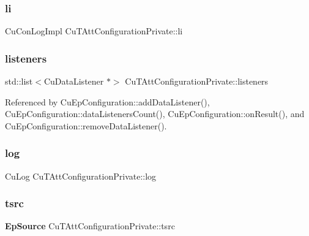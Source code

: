 \mbox{\label{classCuTAttConfigurationPrivate_a93eff7a8218b6d4941d4328b3c048d24}} 
\subsubsection{li}
{\footnotesize\ttfamily Cu\+Con\+Log\+Impl Cu\+T\+Att\+Configuration\+Private\+::li}

\mbox{\label{classCuTAttConfigurationPrivate_ae419412b1e5d82fbf18d79ad622f2d20}} 
\subsubsection{listeners}
{\footnotesize\ttfamily std\+::list$<$Cu\+Data\+Listener $\ast$$>$ Cu\+T\+Att\+Configuration\+Private\+::listeners}



Referenced by Cu\+Ep\+Configuration\+::add\+Data\+Listener(), Cu\+Ep\+Configuration\+::data\+Listeners\+Count(), Cu\+Ep\+Configuration\+::on\+Result(), and Cu\+Ep\+Configuration\+::remove\+Data\+Listener().

\mbox{\label{classCuTAttConfigurationPrivate_a9ba469d4830a26fd4e9c1320abd3fc7e}} 
\subsubsection{log}
{\footnotesize\ttfamily Cu\+Log Cu\+T\+Att\+Configuration\+Private\+::log}

\mbox{\label{classCuTAttConfigurationPrivate_aac90b6d2b8722798431a84f3527e5afe}} 
\subsubsection{tsrc}
{\footnotesize\ttfamily \textbf{ Ep\+Source} Cu\+T\+Att\+Configuration\+Private\+::tsrc}



